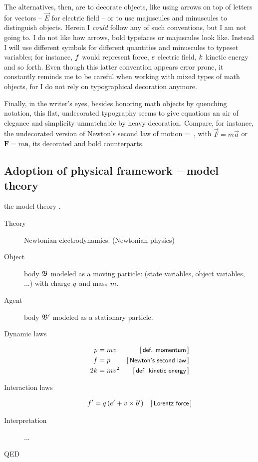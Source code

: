 The alternatives, then, are to decorate objects, like using arrows on top of letters for vectors -- $\vec E$ for electric field -- or to use majuscules and minuscules to distinguish objects. Herein I \emph{could} follow any of such conventions, but I am not going to. I do not like how arrows, bold typefaces or majuscules look like. Instead I will use different symbols for different quantities and minuscules to typeset variables; for instance, $f$ would represent force, $e$ electric field, $k$ kinetic energy and so forth. Even though this latter convention appears error prone, it constantly reminds me to be careful when working with mixed types of math objects, for I do not rely on typographical decoration anymore.

Finally,
%
%
in the writer's eyes, besides honoring math objects by quenching notation, this flat, undecorated typography seems to give equations an air of elegance and simplicity unmatchable by heavy decoration. Compare, for instance, the undecorated version of Newton's second law of motion 
%
%
\beq
  \force = \mass\acc\,,
\eeq
%
with $\vec F = m\vec a$ or $\mathbf{F} = m\mathbf{a}$, its decorated and bold counterparts.


\subsection{Adoption of physical framework -- model theory}\label{sec:physicalframework}
%
\via the model theory \cite{hestenes:1987}.
%
%
\begin{description}
%
\item[Theory] Newtonian electrodynamics: (Newtonian physics)
%
\item[Object] body $\mathfrak{B}$ modeled as a moving particle: (state variables, object variables, ...) with charge $q$ and mass $m$.
%
\item[Agent] body $\mathfrak{B}'$ modeled as a stationary particle.
%
\item[Dynamic laws]
%
\begin{align}
  \mom   &= \mass\vel   & \eqtxt{def. momentum} \\
  \force &= \dt\mom     & \eqtxt{Newton's second law} \\
  2\ekin &= \mass\vel^2 & \eqtxt{def. kinetic energy}
\end{align}
%
\item[Interaction laws]
%
\begin{align}
  \force' &= \echarge\parth{\efield' + \vel\cprod\mfield'} & \eqtxt{Lorentz force}
\end{align}
%
\item[Interpretation] ...
%
\item[QED]
%
\end{description}

